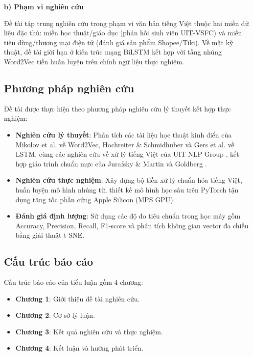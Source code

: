 \documentclass[12pt,a4paper]{article}
\begin{document}
\vspace{0.2cm}\label{sec:pham_vi_nghien_cuu}\noindent\textbf{b) Phạm vi nghiên cứu}\par
Đề tài tập trung nghiên cứu trong phạm vi văn bản tiếng Việt thuộc hai miền dữ liệu đặc thù: miền học thuật/giáo dục (phản hồi sinh viên UIT-VSFC) và miền tiêu dùng/thương mại điện tử (đánh giá sản phẩm Shopee/Tiki). Về mặt kỹ thuật, đề tài giới hạn ở kiến trúc mạng BiLSTM kết hợp với tầng nhúng Word2Vec tiền huấn luyện trên chính ngữ liệu thực nghiệm.

\subsection{Phương pháp nghiên cứu}\label{sec:phuong_phap_nghien_cuu}
Đề tài được thực hiện theo phương pháp nghiên cứu lý thuyết kết hợp thực nghiệm:
\begin{itemize}[leftmargin=1.0cm, itemsep=2pt]
    \item[--] \textbf{Nghiên cứu lý thuyết}: Phân tích các tài liệu học thuật kinh điển của Mikolov et al. \cite{mikolov2013efficient, mikolov2013distributed} về Word2Vec, Hochreiter \& Schmidhuber \cite{hochreiter1997lstm} và Gers et al. \cite{gers2000learning} về LSTM, cùng các nghiên cứu về xử lý tiếng Việt của UIT NLP Group \cite{nguyen2018uit, nguyen2018deep}, kết hợp giáo trình chuẩn mực của Jurafsky \& Martin \cite{jurafsky2026speech} và Goldberg \cite{goldberg2016primer}.
    \item[--] \textbf{Nghiên cứu thực nghiệm}: Xây dựng bộ tiền xử lý chuẩn hóa tiếng Việt, huấn luyện mô hình nhúng từ, thiết kế mô hình học sâu trên PyTorch tận dụng tăng tốc phần cứng Apple Silicon (MPS GPU).
    \item[--] \textbf{Đánh giá định lượng}: Sử dụng các độ đo tiêu chuẩn trong học máy gồm Accuracy, Precision, Recall, F1-score và phân tích không gian vector đa chiều bằng giải thuật t-SNE.
\end{itemize}

\subsection{Cấu trúc báo cáo}\label{sec:cau_truc_bao_cao}
Cấu trúc báo cáo của tiểu luận gồm 4 chương:
\begin{itemize}[leftmargin=1.0cm, itemsep=2pt]
    \item[--] \textbf{Chương 1}: Giới thiệu đề tài nghiên cứu.
    \item[--] \textbf{Chương 2}: Cơ sở lý luận.
    \item[--] \textbf{Chương 3}: Kết quả nghiên cứu và thực nghiệm.
    \item[--] \textbf{Chương 4}: Kết luận và hướng phát triển.
\end{itemize}
\end{document}
